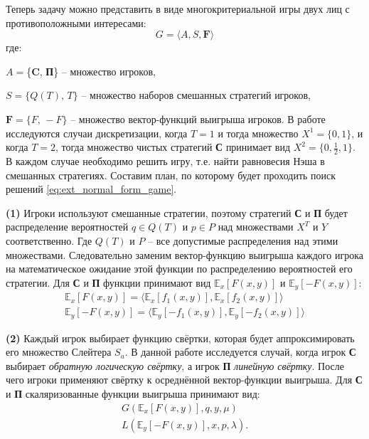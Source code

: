 Теперь задачу можно представить в виде многокритериальной игры двух лиц 
с противоположными интересами:
\begin{equation}
	G = \big \langle A, S, \textbf{F} \big \rangle
\end{equation}
	где: 
 
	$ A = $\{\textbf{C}, \textbf{П}\} -- множество игроков,

	$ S = \{Q(T), \, T\}$ -- множество наборов смешанных
	стратегий игроков,
	
	$ \textbf{F} = \{F, \, -F\}$ -- множество вектор-функций выигрыша
	игроков.
\newline 
В работе исследуются случаи дискретизации, когда $T=1$ и тогда 
множество $X^1=\{0, 1\}$, и когда 
$T=2$, тогда множество чистых стратегий \textbf{С}
принимает вид $X^2=\{0, \frac{1}{2} ,1\}$.
В каждом случае необходимо решить игру, т.е. найти
равновесия Нэша в смешанных стратегиях. Составим план, по которому
будет проходить поиск решений \eqref{eq:ext_normal_form_game}.

\hspace{3mm}

\textbf{(1)} 
Игроки используют смешанные стратегии, поэтому стратегий \textbf{С} и
\textbf{П} будет распределение вероятностей $q \in Q(T)$ и 
$p \in P$ над множествами $X^T$ и $Y$
соответственно. Где $Q(T)$ и $P$ -- все допустимые
распределения над этими множествами.
Следовательно заменим вектор-функцию выигрыша каждого
игрока на математическое ожидание этой функции по распределению вероятностей его
стратегии. Для \textbf{С} и \textbf{П} функции принимают вид 
$\mathbb{E}_x [F(x,y)]$ и $\mathbb{E}_y [-F(x,y)]$:
\begin{gather*}
	\mathbb{E}_x [F(x,y)] = 
	\big \langle
		\mathbb{E}_{x}[f_1(x,y)], \mathbb{E}_{x}[f_2(x, y)]
	\big \rangle
	\\
	\mathbb{E}_y [-F(x,y)] = 
	\big \langle
		\mathbb{E}_{y}[-f_1(x,y)], \mathbb{E}_{y}[-f_2(x, y)]
	\big \rangle
\end{gather*}

\textbf{(2)}
Каждый игрок выбирает функцию свёртки, которая будет аппроксимировать его
множество Слейтера $S_a$. В данной работе исследуется случай, когда
игрок \textbf{С} выбирает \textit{обратную логическую свёртку}, 
а игрок \textbf{П} \textit{линейную свёртку}. После чего игроки 
применяют свёртку к осреднённой вектор-функции выигрыша.
Для \textbf{С} и \textbf{П} скаляризованные функции выигрыша принимают вид:
\begin{gather*}
	G(\mathbb{E}_x [F(x,y)], q, y, \mu)
	\\
	L(\mathbb{E}_y [-F(x,y)], x, p, \lambda).
\end{gather*}

